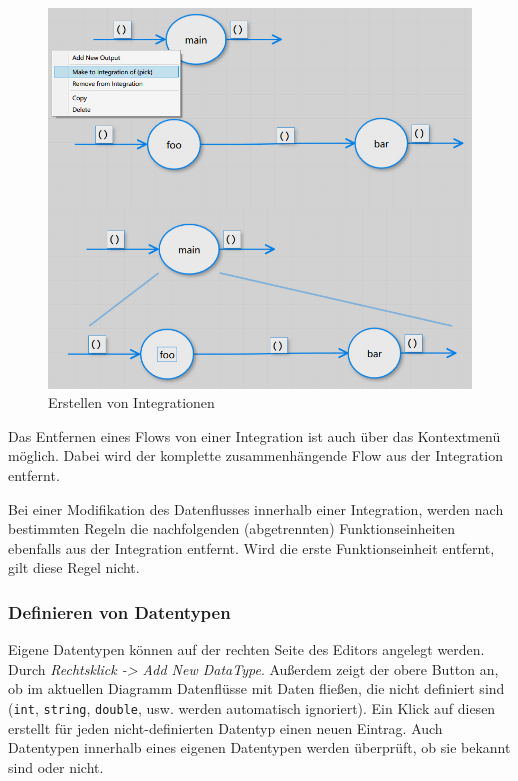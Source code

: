 		\begin{figure}[H]
			\centering
			\includegraphics[width=1\linewidth]{./img/pickIntegration.jpg} 
			\caption{Erstellen von Integrationen}
		\end{figure}
		
	
	
	Das Entfernen eines Flows von einer Integration ist auch über das Kontextmenü
  möglich.
  Dabei wird der komplette zusammenhängende Flow aus der
	Integration entfernt. 
	
	
	Bei einer Modifikation des Datenflusses innerhalb einer Integration, werden nach
	bestimmten Regeln die nachfolgenden (abgetrennten) Funktionseinheiten
	ebenfalls aus der Integration entfernt. Wird die erste Funktionseinheit
	entfernt, gilt diese Regel nicht.
	
	\subsubsection{Definieren von Datentypen}

	Eigene Datentypen können auf der rechten Seite des Editors angelegt werden.
	Durch \textit{Rechtsklick -> Add New DataType}. Außerdem zeigt der obere Button an,
	ob im aktuellen Diagramm Datenflüsse mit Daten fließen, die nicht definiert
	sind (\texttt{int}, \texttt{string}, \texttt{double}, usw. werden automatisch ignoriert). Ein Klick auf diesen erstellt für jeden nicht-definierten Datentyp einen neuen Eintrag.
	Auch Datentypen innerhalb eines eigenen Datentypen werden überprüft, ob sie 
	bekannt sind oder nicht.
	
